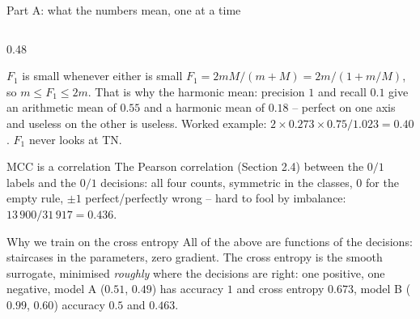 \documentclass[10pt,aspectratio=169]{beamer}
\newcounter{case}
\begin{document}
\begin{frame}{Part A: what the numbers mean, one at a time}
\begin{columns}[T]
\begin{column}{0.48\textwidth}
\begin{block}{$F_1$ is small whenever either is small}
$F_1=2mM/(m+M)=2m/(1+m/M)$, so $m\le F_1\le2m$.  That is why the harmonic
mean: precision $1$ and recall $0.1$ give an arithmetic mean of $0.55$ and
a harmonic mean of $0.18$ -- perfect on one axis and useless on the other
is useless.  Worked example: $2\times0.273\times0.75/1.023=0.40$.  $F_1$
never looks at TN.
\end{block}
\begin{block}{MCC is a correlation}
The Pearson correlation (Section 2.4) between the $0/1$ labels and the
$0/1$ decisions: all four counts, symmetric in the classes, $0$ for the
empty rule, $\pm1$ perfect/perfectly wrong -- hard to fool by imbalance:
$13\,900/31\,917=0.436$.
\end{block}
\begin{block}{Why we train on the cross entropy}
All of the above are functions of the decisions: staircases in the
parameters, zero gradient.  The cross entropy is the smooth surrogate,
minimised \emph{roughly} where the decisions are right: one positive, one
negative, model A ($0.51$, $0.49$) has accuracy $1$ and cross entropy
$0.673$, model B ($0.99$, $0.60$) accuracy $0.5$ and $0.463$.
\end{block}
\end{column}
\end{columns}
\end{frame}
\end{document}
